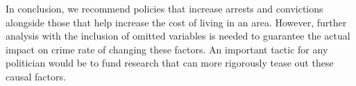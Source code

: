 \documentclass[]{article}
\begin{document}
In conclusion, we recommend policies that increase arrests and
convictions alongside those that help increase the cost of living in an
area. However, further analysis with the inclusion of omitted variables
is needed to guarantee the actual impact on crime rate of changing these
factors. An important tactic for any politician would be to fund
research that can more rigorously tease out these causal factors.
\end{document}
